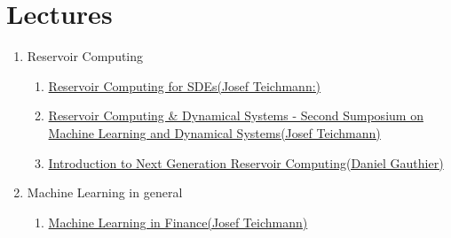 \section{Lectures}

\begin{enumerate}
    \item Reservoir Computing\begin{enumerate}
        \item \href{https://www.youtube.com/watch?v=AhxROWo_FOw}{Reservoir Computing for SDEs(Josef Teichmann:)}
        \item \href{https://www.youtube.com/watch?v=lak3OjvE_44}{Reservoir Computing \& Dynamical Systems - Second Sumposium on Machine Learning and Dynamical Systems(Josef Teichmann)}
        \item \href{https://www.youtube.com/watch?v=wbH4En-k5Gs}{Introduction to Next Generation Reservoir Computing(Daniel Gauthier)}
    \end{enumerate}
    \item Machine Learning in general\begin{enumerate}
        \item \href{https://people.math.ethz.ch/~jteichma/index.php?content=teach_mlf2023}{Machine Learning in Finance(Josef Teichmann)}
    \end{enumerate}
\end{enumerate}

